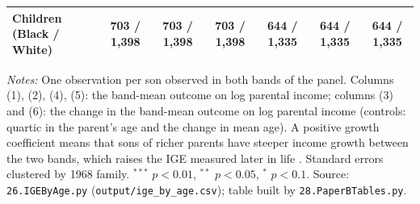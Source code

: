 \begin{table}[!htbp]
{{\begin{tabular}{lcccccc}
Children (Black / White) & 703 / 1,398 & 703 / 1,398 & 703 / 1,398 & 644 / 1,335 & 644 / 1,335 & 644 / 1,335 \\
\bottomrule
\end{tabular}}}
\par\smallskip
\begin{minipage}{\textwidth}\footnotesize \textit{Notes:} One observation per son observed in both bands of the panel. Columns (1), (2), (4), (5): the band-mean outcome on log parental income; columns (3) and (6): the change in the band-mean outcome on log parental income (controls: quartic in the parent's age and the change in mean age). A positive growth coefficient means that sons of richer parents have steeper income growth between the two bands, which raises the IGE measured later in life \citep{haider2006life}. Standard errors clustered by 1968 family. $^{***}$ $p<0.01$, $^{**}$ $p<0.05$, $^{*}$ $p<0.1$. Source: \texttt{26.IGEByAge.py} (\texttt{output/ige\_by\_age.csv}); table built by \texttt{28.PaperBTables.py}.\end{minipage}
\end{table}
